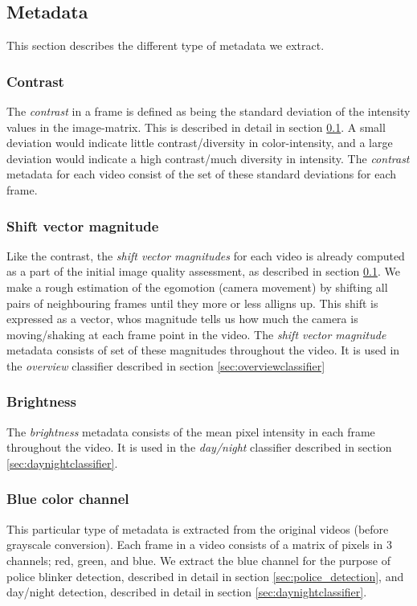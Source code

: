 \subsection{Metadata}
%
This section describes the different type of metadata we extract.
%
\subsubsection{Contrast}\label{sec:contrastdata}
%
The \textit{contrast} in a frame is defined as being the standard deviation of the intensity values in the image-matrix. This is described in detail in section \ref{}. A small deviation would indicate little contrast/diversity in color-intensity, and a large deviation would indicate a high contrast/much diversity in intensity. The \textit{contrast} metadata for each video consist of the set of these standard deviations for each frame.
%
\subsubsection{Shift vector magnitude}\label{sec:svmdata}
%
Like the contrast, the \textit{shift vector magnitudes} for each video is already computed as a part of the initial image quality assessment, as described in section \ref{}. We make a rough estimation of the egomotion (camera movement) by shifting all pairs of neighbouring frames until they more or less alligns up. This shift is expressed as a vector, whos magnitude tells us how much the camera is moving/shaking at each frame point in the video. The \textit{shift vector magnitude} metadata consists of set of these magnitudes throughout the video. It is used in the \textit{overview} classifier described in section \ref{sec:overviewclassifier}
%
\subsubsection{Brightness}\label{sec:brightnessdata}
%
The \textit{brightness} metadata consists of the mean pixel intensity in each frame throughout the video. It is used in the \textit{day/night} classifier described in section \ref{sec:daynightclassifier}.
%
\subsubsection{Blue color channel}\label{sec:blue_channel}
%
This particular type of metadata is extracted from the original videos (before grayscale conversion). Each frame in a video consists of a matrix of pixels in 3 channels; red, green, and blue. We extract the blue channel for the purpose of police blinker detection, described in detail in section \ref{sec:police_detection}, and day/night detection, described in detail in section \ref{sec:daynightclassifier}.
%
